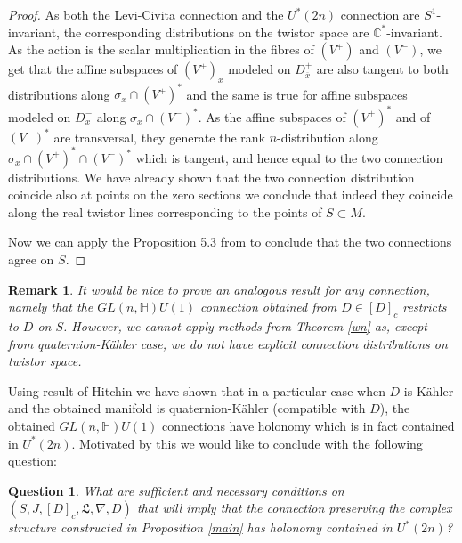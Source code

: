 \documentclass{amsart}
\newtheorem{rem}{Remark}[section]
\newtheorem{que}{Question}
\begin{document}
\begin{proof}
 
   As both the Levi-Civita connection and the $U^*(2n)$ connection are $S^1$-invariant, the corresponding distributions on the twistor space are $\mathbb{C}^*$-invariant.  As the action is the scalar multiplication in the fibres of $(V^+)$ and $(V^-)$, we get that the affine subspaces of $(V^+)_{\overline{x}}$ modeled on $D_{\overline{x}}^+$ are also tangent to both distributions along $\sigma_x\cap (V^+)^*$ and the same is true for affine subspaces modeled on $D_x^-$ along $\sigma_x\cap (V^-)^*$. 
   As the affine subspaces of $(V^+)^*$ and of $ (V^-)^*$ are transversal, they generate the rank $n$-distribution along $\sigma_x\cap (V^+)^*\cap (V^-)^*$ which is tangent, and hence equal to the two connection distributions. We have already shown that the two connection distribution coincide also at points on the zero sections we conclude that indeed 
they coincide along the real twistor lines corresponding to the points of $S\subset M$.  

    Now we can apply the Proposition 5.3 from \cite{Alex} to conclude that the two connections agree on $S$.  
    
\end{proof}
\begin{rem}
It would be nice to prove an analogous result for any connection, namely that the  $GL(n,\mathbb{H})U(1)$ connection obtained from $D\in[D]_c$ restricts to $D$
 on $S$. However, we cannot apply methods from Theorem \ref{wn} as, except from quaternion-K\"ahler case,  we do not have explicit connection distributions on twistor space. 
  
\end{rem}
Using result of Hitchin \cite{Hit3} we have shown that in a particular case when $D$ is K\"ahler and the obtained manifold is quaternion-K\"ahler (compatible with $D$), the obtained $GL(n,\mathbb{H})U(1)$ connections have holonomy which is in fact contained in $U^*(2n)$. Motivated by this we would like to conclude with the following question:
\begin{que}
What are sufficient and necessary conditions on $(S,J,[D]_c,\mathfrak{L},\nabla, D) $ that will imply that the connection preserving the complex structure constructed in Proposition \ref{main} has holonomy contained in $U^*(2n)$?
\end{que}
 
\end{document}
